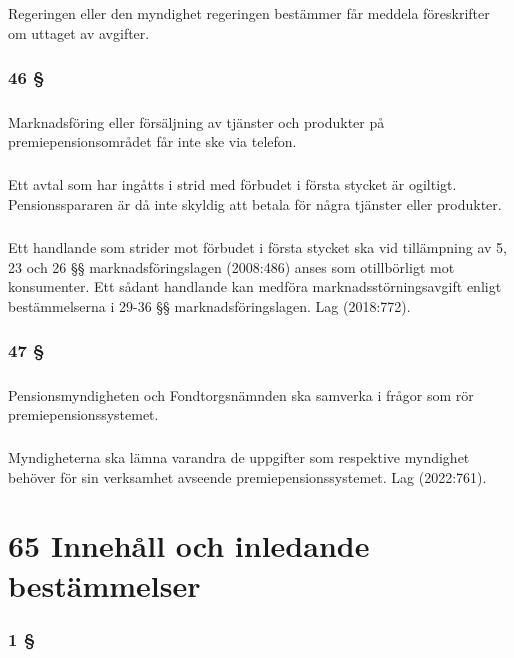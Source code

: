 \documentclass[a4paper,notitlepage,openany,10pt]{book}
\begin{document}
\paragraph*{}
Regeringen eller den myndighet regeringen bestämmer får meddela föreskrifter om uttaget av avgifter.
\subsection*{46 §}
\paragraph*{}
Marknadsföring eller försäljning av tjänster och produkter på premiepensionsområdet får inte ske via telefon.
\paragraph*{}
Ett avtal som har ingåtts i strid med förbudet i första stycket är ogiltigt. Pensionsspararen är då inte skyldig att betala för några tjänster eller produkter.
\paragraph*{}
Ett handlande som strider mot förbudet i första stycket ska vid tillämpning av 5, 23 och 26 §§ marknadsföringslagen (2008:486) anses som otillbörligt mot konsumenter. Ett sådant handlande kan medföra marknadsstörningsavgift enligt bestämmelserna i 29-36 §§ marknadsföringslagen.
Lag (2018:772).
\subsection*{47 §}
\paragraph*{}
Pensionsmyndigheten och Fondtorgsnämnden ska samverka i frågor som rör premiepensionssystemet.
\paragraph*{}
Myndigheterna ska lämna varandra de uppgifter som respektive myndighet behöver för sin verksamhet avseende premiepensionssystemet.
Lag (2022:761).
\chapter*{65 Innehåll och inledande bestämmelser}
\subsection*{1 §}
\end{document}
